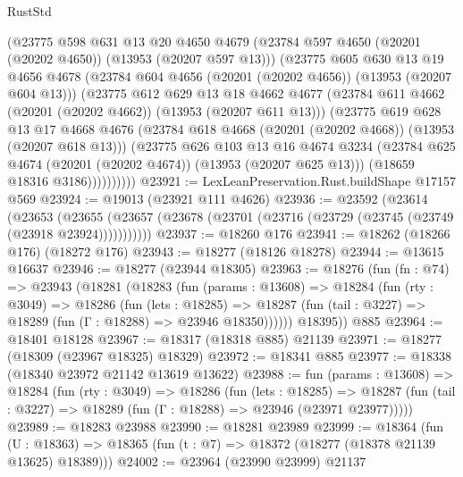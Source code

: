 \begin{lexlean}{RustStd}
\begin{coremodule}
            (@23775
              @598
              @631
              @13
              @20
              @4650
              @4679
              (@23784 @597 @4650 (@20201 (@20202 @4650)) (@13953 (@20207 @597 @13)))
              (@23775
                @605
                @630
                @13
                @19
                @4656
                @4678
                (@23784 @604 @4656 (@20201 (@20202 @4656)) (@13953 (@20207 @604 @13)))
                (@23775
                  @612
                  @629
                  @13
                  @18
                  @4662
                  @4677
                  (@23784 @611 @4662 (@20201 (@20202 @4662)) (@13953 (@20207 @611 @13)))
                  (@23775
                    @619
                    @628
                    @13
                    @17
                    @4668
                    @4676
                    (@23784 @618 @4668 (@20201 (@20202 @4668)) (@13953 (@20207 @618 @13)))
                    (@23775
                      @626
                      @103
                      @13
                      @16
                      @4674
                      @3234
                      (@23784 @625 @4674 (@20201 (@20202 @4674)) (@13953 (@20207 @625 @13)))
                      (@18659 @18316 @3186))))))))))
@23921 := LexLeanPreservation.Rust.buildShape @17157 @569
@23924 := @19013 (@23921 @111 @4626)
@23936 := @23592
    (@23614
      (@23653
        (@23655 (@23657 (@23678 (@23701 (@23716 (@23729 (@23745 (@23749 (@23918 @23924)))))))))))
@23937 := @18260 @176
@23941 := @18262 (@18266 @176) (@18272 @176)
@23943 := @18277 (@18126 @18278)
@23944 := @13615 @16637
@23946 := @18277 (@23944 @18305)
@23963 := @18276
    (fun (fn : @74) =>
    @23943
      (@18281
        (@18283
          (fun (params : @13608) =>
          @18284
            (fun (rty : @3049) =>
            @18286
              (fun (lets : @18285) =>
              @18287 (fun (tail : @3227) => @18289 (fun (Γ : @18288) => @23946 @18350))))))
        @18395))
    @885
@23964 := @18401 @18128
@23967 := @18317 (@18318 @885) @21139
@23971 := @18277 (@18309 (@23967 @18325) @18329)
@23972 := @18341 @885
@23977 := @18338 (@18340 @23972 @21142 @13619 @13622)
@23988 := fun (params : @13608) =>
  @18284
    (fun (rty : @3049) =>
    @18286
      (fun (lets : @18285) =>
      @18287 (fun (tail : @3227) => @18289 (fun (Γ : @18288) => @23946 (@23971 @23977)))))
@23989 := @18283 @23988
@23990 := @18281 @23989
@23999 := @18364
    (fun (U : @18363) => @18365 (fun (t : @7) => @18372 (@18277 (@18378 @21139 @13625) @18389)))
@24002 := @23964 (@23990 @23999) @21137

\end{coremodule}
\end{lexlean}
